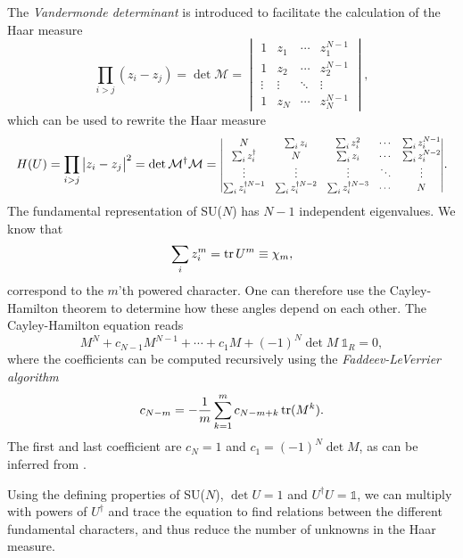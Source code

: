 The \emph{Vandermonde determinant} is introduced to facilitate the calculation
of the Haar measure
%
\begin{equation}
  \prod_{i>j} (z_i - z_j) = \det \mathcal{M} =
  \begin{vmatrix}
    1 & z_1 & \cdots & z_1^{N-1} \\
    1 & z_2 & \cdots & z_2^{N-1} \\
    \vdots & \vdots & \ddots & \vdots \\
    1 & z_N & \cdots & z_N^{N-1} 
  \end{vmatrix},
\end{equation}
%
which can be used to rewrite the Haar measure
%
\begin{equation}
  H(U) = \prod_{i>j} \big| z_i - z_j \big|^2
   = \det \mathcal{M}^{\dagger} \mathcal{M} = \scalemath{0.8}{%
  \begin{vmatrix}
    N & \sum_i z_i & \sum_i z_i^2 & \cdots & \sum_i z_i^{N-1} \\
    \sum_i z_i^{\dagger} & N & \sum_i z_i & \cdots & \sum_i z_i^{N-2} \\
    \vdots & \vdots & \vdots & \ddots & \vdots \\
    \sum_i z_i^{\dagger N-1} & \sum_i z_i^{\dagger N-2} & \sum_i z_i^{\dagger N-3} & \cdots & N
  \end{vmatrix}}.
\end{equation}
%
The fundamental representation of SU($N$) has $N - 1$ independent eigenvalues.
We know that
%
\begin{equation}
  \sum_i z_i^m = \operatorname{tr} U^m \equiv \chi_m,
\end{equation}
%
correspond to the $m$'th powered character. One can therefore use the
Cayley-Hamilton theorem to determine how these angles depend on each other.
The Cayley-Hamilton equation reads
%
\begin{equation} \label{eq:caylay-hamilton}
  M^N + c_{N-1} M^{N-1} + \cdots + c_1 M + (-1)^N \det M\: \mathbb{1}_R = 0,
\end{equation}
%
where the coefficients can be computed recursively using the \emph{Faddeev-LeVerrier
algorithm}
%
\begin{equation}
  c_{N-m} = -\frac{1}{m} \sum_{k=1}^m c_{N-m+k} \operatorname{tr} (M^k).
\end{equation}
%
The first and last coefficient are $c_N = 1$ and $c_1 = (-1)^N \det M$, as can
be inferred from .

Using the defining properties of SU($N$), $\det U = 1$ and $U^{\dagger} U =
\mathbb{1}$, we can multiply  with powers of
$U^{\dagger}$ and trace the equation to find relations between the different
fundamental characters, and thus reduce the number of unknowns in the Haar
measure.

